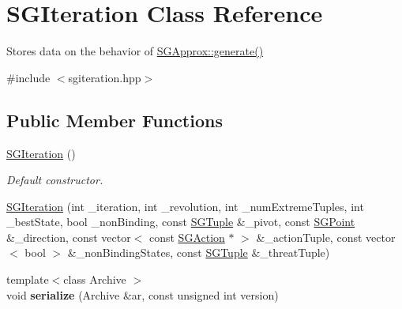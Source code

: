 \hypertarget{classSGIteration}{\section{S\-G\-Iteration Class Reference}
\label{classSGIteration}
}


Stores data on the behavior of \hyperlink{classSGApprox_ac32645eb1ff336044f7ee5d523c610ce}{S\-G\-Approx\-::generate()}  




{\ttfamily \#include $<$sgiteration.\-hpp$>$}

\subsection*{Public Member Functions}
\begin{DoxyCompactItemize}
\item 
\hypertarget{classSGIteration_aa47645b3a728b2ca55ad2e7d17c5c488}{\hyperlink{classSGIteration_aa47645b3a728b2ca55ad2e7d17c5c488}{S\-G\-Iteration} ()}\label{classSGIteration_aa47645b3a728b2ca55ad2e7d17c5c488}

\begin{DoxyCompactList}\small\item\em Default constructor. \end{DoxyCompactList}\item 
\hyperlink{classSGIteration_a66e36d5150597815900248836eb345b3}{S\-G\-Iteration} (int \-\_\-iteration, int \-\_\-revolution, int \-\_\-num\-Extreme\-Tuples, int \-\_\-best\-State, bool \-\_\-non\-Binding, const \hyperlink{classSGTuple}{S\-G\-Tuple} \&\-\_\-pivot, const \hyperlink{classSGPoint}{S\-G\-Point} \&\-\_\-direction, const vector$<$ const \hyperlink{classSGAction}{S\-G\-Action} $\ast$ $>$ \&\-\_\-action\-Tuple, const vector$<$ bool $>$ \&\-\_\-non\-Binding\-States, const \hyperlink{classSGTuple}{S\-G\-Tuple} \&\-\_\-threat\-Tuple)
\item 
\hypertarget{classSGIteration_a19860e6d2af702df4ce47e36d4d43ec5}{{\footnotesize template$<$class Archive $>$ }\\void {\bfseries serialize} (Archive \&ar, const unsigned int version)}\label{classSGIteration_a19860e6d2af702df4ce47e36d4d43ec5}

\end{DoxyCompactItemize}
